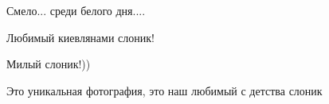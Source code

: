  
 
 
 
 

Смело... среди белого дня....

Любимый киевлянами слоник!

Милый слоник!))

Это уникальная фотография, это наш любимый с детства слоник
